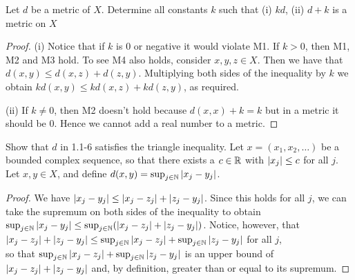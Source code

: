 \begin{exercise}{5}
Let $d$ be a metric of $X$. Determine all constants $k$ such that (i) $kd$, (ii) $d+k$ is a metric on $X$
\end{exercise}
\begin{proof}
(i) Notice that if $k$ is 0 or negative it would violate M1. If $k>0$, then M1, M2 and M3 hold. To see M4 also holds, consider $x,y,z\in X$. Then we have that $d(x,y)\leq d(x,z)+d(z,y)$. Multiplying both sides of the inequality by $k$ we obtain $kd(x,y)\leq kd(x,z)+kd(z,y)$, as required.

(ii) If $k\neq 0$, then M2 doesn't hold because $d(x,x)+k=k$ but in a metric it should be 0. Hence we cannot add a real number to a metric.
\end{proof}

\begin{exercise}{6}
Show that $d$ in 1.1-6 satisfies the triangle inequality. Let $x=(x_1,x_2,\dots)$ be a bounded complex sequence, so that there exists a $c\in\mathbb{R}$ with $\left\lvert x_j\right\rvert\leq c$ for all $j$. Let $x,y\in X$, and define $d(x,y)=\sup_{j\in\mathbb{N}}\left\lvert x_j-y_j\right\rvert$.
\end{exercise}
\begin{proof}
We have $\left\lvert x_j-y_j\right\rvert \leq \left\lvert x_j-z_j\right\rvert+\left\lvert z_j-y_j\right\rvert$. Since this holds for all $j$, we can take the supremum on both sides of the inequality to obtain $\sup_{j\in\mathbb{N}}\left\lvert x_j-y_j\right\rvert \leq \sup_{j\in\mathbb{N}}(\left\lvert x_j-z_j\right\rvert+\left\lvert z_j-y_j\right\rvert)$. Notice, however, that\\ $\left\lvert x_j-z_j\right\rvert+\left\lvert z_j-y_j\right\rvert\leq \sup_{j\in\mathbb{N}}\left\lvert x_j-z_j\right\rvert+\sup_{j\in\mathbb{N}}\left\lvert z_j-y_j\right\rvert$ for all $j$,\\ so that $\sup_{j\in\mathbb{N}}\left\lvert x_j-z_j\right\rvert+\sup_{j\in\mathbb{N}}\left\lvert z_j-y_j\right\rvert$ is an upper bound of $\left\lvert x_j-z_j\right\rvert+\left\lvert z_j-y_j\right\rvert$ and, by definition, greater than or equal to its supremum.
\end{proof}

